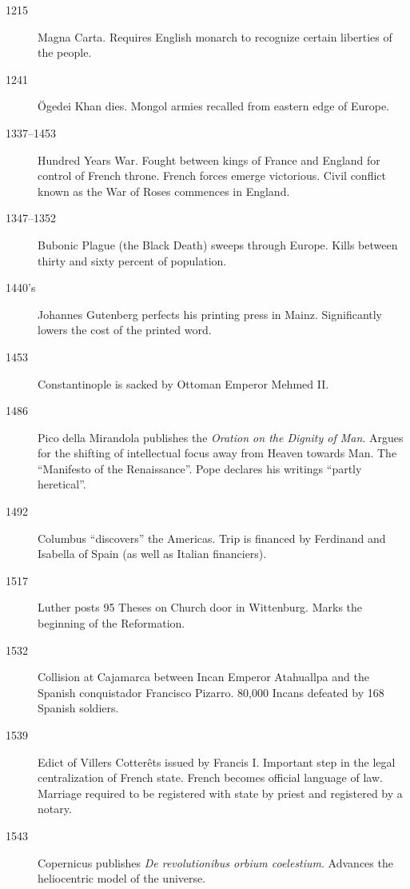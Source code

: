 \documentclass[11pt]{article}
\begin{document}
\begin{description}
\item[1215]  Magna Carta.  Requires English monarch to recognize certain liberties of the people.

\item[1241]  \"{O}gedei Khan dies.  Mongol armies recalled from eastern edge of Europe.

\item[1337--1453]  Hundred Years War.  Fought between kings of France and England for control of French throne.  French forces emerge victorious.  Civil conflict known as the War of Roses commences in England.

\item[1347--1352]  Bubonic Plague (the Black Death) sweeps through Europe.  Kills between thirty and sixty percent of population.

\item[1440's]  Johannes Gutenberg perfects his printing press in Mainz.  Significantly lowers the cost of the printed word. 

\item[1453]  Constantinople is sacked by Ottoman Emperor Mehmed II.

\item[1486]  Pico della Mirandola publishes the \textit{Oration on the Dignity of Man}.  Argues for the shifting of intellectual focus away from Heaven towards Man.  The ``Manifesto of the Renaissance''.  Pope declares his writings ``partly heretical''.

\item[1492]  Columbus ``discovers'' the Americas.  Trip is financed by Ferdinand and Isabella of Spain (as well as Italian financiers). 

\item[1517]  Luther posts 95 Theses on Church door in Wittenburg.  Marks the beginning of the Reformation.

\item[1532]  Collision at Cajamarca between Incan Emperor Atahuallpa and the Spanish conquistador Francisco Pizarro.  80,000 Incans defeated by 168 Spanish soldiers.   

\item[1539]  Edict of Villers Cotter\^{e}ts issued by Francis I.  Important step in the legal centralization of French state.  French becomes official language of law.  Marriage required to be registered with state by priest and registered by a notary.

\item[1543]  Copernicus publishes \textit{De revolutionibus orbium coelestium}.  Advances the heliocentric model of the universe.


\end{description}
\end{document}
